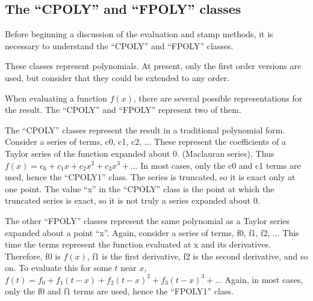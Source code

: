 %
%
%
%
\subsection{The ``CPOLY'' and ``FPOLY'' classes}

Before beginning a discussion of the evaluation and stamp methods, it
is necessary to understand the ``CPOLY'' and ``FPOLY'' classes.

These classes represent polynomials.  At present, only the first order
versions are used, but consider that they could be extended to any
order.

When evaluating a function $f(x)$, there are several possible
representations for the result.  The ``CPOLY'' and ``FPOLY'' represent
two of them.

The ``CPOLY'' classes represent the result in a traditional polynomial
form.  Consider a series of terms, c0, c1, c2, ...  These represent
the coefficients of a Taylor series of the function expanded about 0.
(Maclauran series).  Thus $f(x) = c_0 + c_1 x + c_2 x^2 + c_3 x^3 +
... $ In most cases, only the c0 and c1 terms are used, hence the
``CPOLY1'' class.  The series is truncated, so it is exact only at one
point.  The value ``x'' in the ``CPOLY'' class is the point at which
the truncated series is exact, so it is not truly a series expanded
about 0.

The other ``FPOLY'' classes represent the same polynomial as a Taylor
series expanded about a point ``x''.  Again, consider a series of
terms, f0, f1, f2, ...  This time the terms represent the function
evaluated at x and its derivatives.  Therefore, f0 is $f(x)$, f1 is
the first derivative, f2 is the second derivative, and so on.  To
evaluate this for some $t$ near $x$, $f(t) = f_0 + f_1 (t-x) + f_2
(t-x)^2 + f_3 (t-x)^3 + ... $ Again, in most cases, only the f0 and f1
terms are used, hence the ``FPOLY1'' class.

